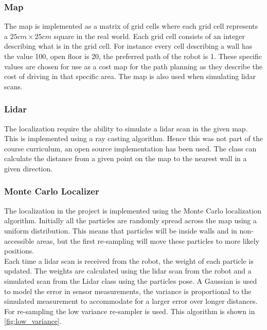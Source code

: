 \subsubsection{Map}
The map is implemented as a matrix of grid cells where each grid cell represents a $25cm\times25cm$ square in the real world. Each grid cell consists of an integer describing what is in the grid cell. For instance every cell describing a wall has the value 100, open floor is 20, the preferred path of the robot is 1. These specific values are chosen for use as a cost map for the path planning as they describe the cost of driving in that specific area. The map is also used when simulating lidar scans.

\subsubsection{Lidar}
The localization require the ability to simulate a lidar scan in the given map. This is implemented using a ray casting algorithm. Hence this was not part of the course curriculum, an open source implementation has been used. The class can calculate the distance from a given point on the map to the nearest wall in a given direction.

\subsubsection{Monte Carlo Localizer}
The localization in the project is implemented using the Monte Carlo localization algorithm. Initially all the particles are randomly spread across the map using a uniform distribution. This means that particles will be inside walls and in non-accessible areas, but the first re-sampling will move these particles to more likely positions.\\

Each time a lidar scan is received from the robot, the weight of each particle is updated. The weights are calculated using the lidar scan from the robot and a simulated scan from the Lidar class using the particles pose.
A Gaussian is used to model the error in sensor measurements, the variance is proportional to the simulated measurement to accommodate for a larger error over longer distances. For re-sampling the low variance re-sampler is used. This algorithm is shown in \autoref{fig:low_variance}.\\

